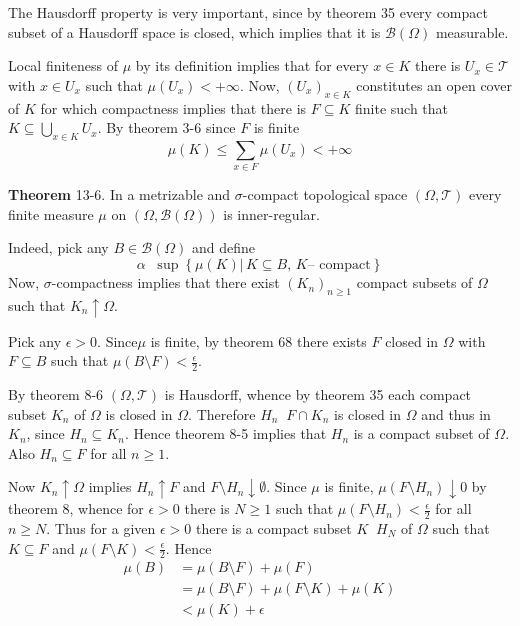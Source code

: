 \documentclass[a4paper]{article}
\newcommand{\obj}[1]{\left\{ #1 \right \}}
\newcommand{\brac}[1]{\left ( #1 \right )}
\newcommand{\induc}[1]{\left . #1 \right \vert}
\newcommand{\Tcal}{\mathcal{T}}
\newcommand{\borel}[1]{\mathcal{B}\brac{#1}}
\newcommand{\defn}{\mathop{\overset{\Delta}{=}}\nolimits}
\begin{document}
The Hausdorff property is very important, since by theorem 35 every compact subset of a Hausdorff space is closed, which implies that it is $\borel{\Omega}$ measurable.

Local finiteness of $\mu$ by its definition implies that for every $x\in K$ there is $U_x\in\Tcal$ with $x\in U_x$ such that $\mu\brac{U_x}<+\infty$. Now, $\brac{U_x}_{x\in K}$ constitutes an open cover of $K$ for which compactness implies that there is $F\subseteq K$ finite such that $K\subseteq \bigcup_{x\in K} U_x$. By theorem 3-6 since $F$ is finite \[\mu\brac{K}\leq \sum_{x\in F} \mu\brac{U_x}<+\infty\]

\label{thm:metr_sig_comp_meas_finite} \noindent \textbf{Theorem} 13-6.
In a metrizable and $\sigma$-compact topological space $\brac{\Omega,\Tcal}$ every finite measure $\mu$ on $\brac{\Omega,\borel{\Omega}}$ is inner-regular.

Indeed, pick any $B\in \borel{\Omega}$ and define \[\alpha\defn \sup\obj{\induc{\mu\brac{K}}\,K\subseteq B,\,K\text{-- compact}}\] Now, $\sigma$-compactness implies that there exist $\brac{K_n}_{n\geq1}$ compact subsets of $\Omega$ such that $K_n\uparrow \Omega$.

Pick any $\epsilon>0$. Since$\mu$ is finite, by theorem 68 there exists $F$ closed in $\Omega$ with $F\subseteq B$ such that $\mu\brac{B\setminus F}<\frac{\epsilon}{2}$.

By theorem 8-6 $\brac{\Omega, \Tcal}$ is Hausdorff, whence by theorem 35 each compact subset $K_n$ of $\Omega$ is closed in $\Omega$. Therefore $H_n\defn F\cap K_n$ is closed in $\Omega$ and thus in $K_n$, since $H_n\subseteq K_n$. Hence theorem 8-5 implies that $H_n$ is a compact subset of $\Omega$. Also $H_n\subseteq F$ for all $n\geq1$.

Now $K_n\uparrow \Omega$ implies $H_n\uparrow F$ and $F\setminus H_n\downarrow \emptyset$. Since $\mu$ is finite, $\mu\brac{F\setminus H_n}\downarrow 0$ by theorem 8, whence for $\epsilon>0$ there is $N\geq1$ such that $\mu\brac{F\setminus H_n}<\frac{\epsilon}{2}$ for all $n\geq N$. Thus for a given $\epsilon>0$ there is a compact subset $K\defn H_N$ of $\Omega$ such that $K\subseteq F$ and $\mu\brac{F\setminus K}<\frac{\epsilon}{2}$. Hence \begin{align*}\mu\brac{B} &= \mu\brac{B\setminus F} + \mu\brac{F} \\&= \mu\brac{B\setminus F} + \mu\brac{F\setminus K} + \mu\brac{K}\\ &<\mu\brac{K} + \epsilon\end{align*}
\end{document}
